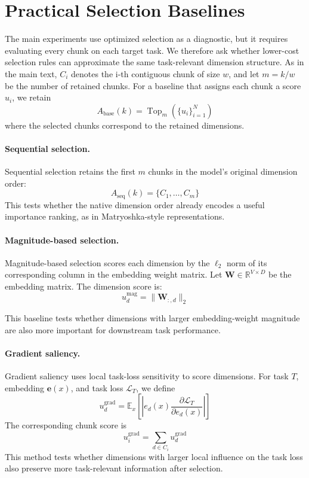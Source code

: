 \documentclass[11pt]{article}
\begin{document}
\section{Practical Selection Baselines}
\label{sec:practical_baselines}

The main experiments use optimized selection as a diagnostic, but it requires evaluating every chunk on each target task. We therefore ask whether lower-cost selection rules can approximate the same task-relevant dimension structure. As in the main text, $C_i$ denotes the i-th contiguous chunk of size $w$, and let $m=k/w$ be the number of retained chunks. For a baseline that assigns each chunk a score $u_i$, we retain
\begin{equation}
A_{\mathrm{base}}(k)
=
\operatorname{Top}_{m}\left(\{u_i\}_{i=1}^{N}\right)
\end{equation}
where the selected chunks correspond to the retained dimensions. 

\paragraph{Sequential selection.}
Sequential selection retains the first $m$ chunks in the model's original dimension order:
\begin{equation}
A_{\mathrm{seq}}(k)
=
\{C_1,\ldots,C_m\}
\end{equation}
This tests whether the native dimension order already encodes a useful importance ranking, as in Matryoshka-style representations. 

\paragraph{Magnitude-based selection.}
Magnitude-based selection scores each dimension by the $\ell_2$ norm of its corresponding column in the embedding weight matrix. Let $\mathbf{W}\in\mathbb{R}^{V\times D}$ be the embedding matrix. The dimension score is:
\begin{equation}
u_d^{\mathrm{mag}}
=
\|\mathbf{W}_{:,d}\|_2
\end{equation}

This baseline tests whether dimensions with larger embedding-weight magnitude are also more important for downstream task performance.

\paragraph{Gradient saliency.}
Gradient saliency uses local task-loss sensitivity to score dimensions. For task $T$, embedding $\mathbf{e}(x)$, and task loss $\mathcal{L}_T$, we define
\begin{equation}
u_d^{\mathrm{grad}}
=
\mathbb{E}_{x}
\left[
\left|
e_d(x)
\frac{\partial \mathcal{L}_T}{\partial e_d(x)}
\right|
\right]
\end{equation}
The corresponding chunk score is
\begin{equation}
u_i^{\mathrm{grad}}
=
\sum_{d\in C_i}u_d^{\mathrm{grad}} 
\end{equation}
This method tests whether dimensions with larger local influence on the task loss also preserve more task-relevant information after selection.
\end{document}
